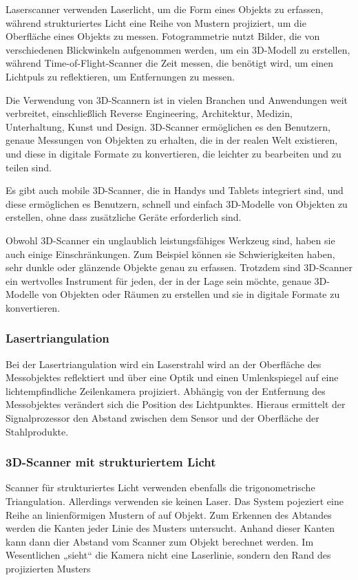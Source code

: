 Laserscanner verwenden Laserlicht, um die Form eines Objekts zu erfassen, während strukturiertes Licht eine Reihe von Mustern projiziert, um die Oberfläche eines Objekts zu messen. Fotogrammetrie nutzt Bilder, die von verschiedenen Blickwinkeln aufgenommen werden, um ein 3D-Modell zu erstellen, während Time-of-Flight-Scanner die Zeit messen, die benötigt wird, um einen Lichtpuls zu reflektieren, um Entfernungen zu messen.

Die Verwendung von 3D-Scannern ist in vielen Branchen und Anwendungen weit verbreitet, einschließlich Reverse Engineering, Architektur, Medizin, Unterhaltung, Kunst und Design. 3D-Scanner ermöglichen es den Benutzern, genaue Messungen von Objekten zu erhalten, die in der realen Welt existieren, und diese in digitale Formate zu konvertieren, die leichter zu bearbeiten und zu teilen sind.

Es gibt auch mobile 3D-Scanner, die in Handys und Tablets integriert sind, und diese ermöglichen es Benutzern, schnell und einfach 3D-Modelle von Objekten zu erstellen, ohne dass zusätzliche Geräte erforderlich sind.

Obwohl 3D-Scanner ein unglaublich leistungsfähiges Werkzeug sind, haben sie auch einige Einschränkungen. Zum Beispiel können sie Schwierigkeiten haben, sehr dunkle oder glänzende Objekte genau zu erfassen. Trotzdem sind 3D-Scanner ein wertvolles Instrument für jeden, der in der Lage sein möchte, genaue 3D-Modelle von Objekten oder Räumen zu erstellen und sie in digitale Formate zu konvertieren.

\subsubsection{Lasertriangulation}
Bei der Lasertriangulation wird ein Laserstrahl wird an der Oberfläche des Messobjektes reflektiert und über eine Optik und einen Umlenkspiegel auf eine lichtempfindliche Zeilenkamera projiziert. Abhängig von der Entfernung des Messobjektes verändert sich die Position des Lichtpunktes. Hieraus ermittelt der Signalprozessor den Abstand zwischen dem Sensor und der Oberfläche der Stahlprodukte.

\subsubsection{3D-Scanner mit strukturiertem Licht}
Scanner für strukturiertes Licht verwenden ebenfalls die trigonometrische Triangulation. Allerdings verwenden sie keinen Laser. Das System pojeziert eine Reihe an linienförmigen Mustern of auf Objekt. Zum Erkennen des Abtandes werden die Kanten jeder Linie des Musters untersucht. Anhand dieser Kanten kann dann dier Abstand vom Scanner zum Objekt berechnet werden. Im Wesentlichen „sieht“ die Kamera nicht eine Laserlinie, sondern den Rand des projizierten Musters

